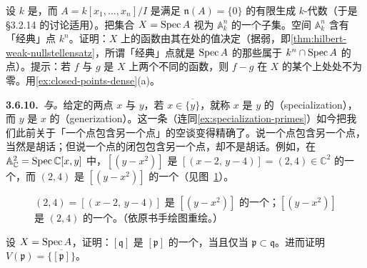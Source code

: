 \begin{exercise}\label{ex:functions-determined-by-closed-points}
设 $k$ 是\trAlgClosedField，而 $A=k[x_1,\dots,x_n]/I$ 是满足 $\mathfrak{n}(A)=\{0\}$ 的有限生成 $k$-代数（于是 \S3.2.14 的讨论适用）。把集合 $X=\operatorname{Spec} A$ 视为 $\mathbb{A}^n_k$ 的一个子集。空间 $\mathbb{A}^n_k$ 含有「经典」点 $k^n$。证明：$X$ 上的函数由其在\trClosedPoint{}处的值决定（据弱\trNullstellensatz，即\cref{thm:hilbert-weak-nullstellensatz}，所谓「经典」点就是 $\operatorname{Spec} A$ 的那些属于 $k^n\cap\operatorname{Spec} A$ 的点）。提示：若 $f$ 与 $g$ 是 $X$ 上两个不同的函数，则 $f-g$ 在 $X$ 的某个\trOpenSubset{}上处处不为零。用\cref{ex:closed-points-dense}(a)。
\end{exercise}

\textbf{3.6.10.}\ \emph{\trSpecialization{}与\trGenerization{}。}\quad 给定\trTopologicalSpace{}的两点 $x$ 与 $y$，若 $x\in\overline{\{y\}}$，就称 $x$ 是 $y$ 的\textbf{\trSpecialization{}}（specialization），而 $y$ 是 $x$ 的\textbf{\trGenerization{}}（generization）。这一条（连同\cref{ex:specialization-primes}）如今把我们此前关于「一个点包含另一个点」的空谈变得精确了。说一个点包含另一个点，当然是胡话；但说一个点的闭包包含另一个点，却不是胡话。例如，在 $\mathbb{A}^2_{\mathbb{C}}=\operatorname{Spec}\mathbb{C}[x,y]$ 中，$[(y-x^2)]$ 是 $[(x-2,\,y-4)]=(2,4)\in\mathbb{C}^2$ 的一个\trGenerization{}，而 $(2,4)$ 是 $[(y-x^2)]$ 的一个\trSpecialization{}（见图~\ref{fig:specialization-generization}）。

\begin{figure}[htbp]
\centering
{}
\caption{$(2,4)=[(x-2,\,y-4)]$ 是 $[(y-x^2)]$ 的一个\trSpecialization{}；$[(y-x^2)]$ 是 $(2,4)$ 的一个\trGenerization{}。（依原书手绘图重绘。）}\label{fig:specialization-generization}
\end{figure}

\begin{exercise}\label{ex:specialization-primes}
设 $X=\operatorname{Spec} A$，证明：$[\mathfrak{q}]$ 是 $[\mathfrak{p}]$ 的一个\trSpecialization{}，当且仅当 $\mathfrak{p}\subset\mathfrak{q}$。进而证明 $V(\mathfrak{p})=\overline{\{[\mathfrak{p}]\}}$。
\end{exercise}

